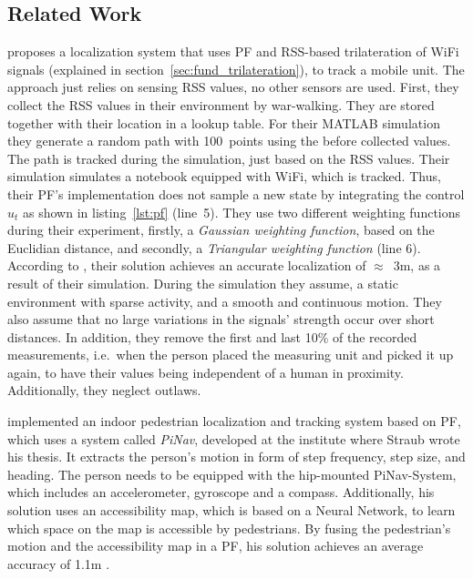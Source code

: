 \subsection{Related Work}

\citet{Siddiqui:tracking} proposes a localization system that uses \ac{PF} and \ac{RSS}-based trilateration of WiFi signals (explained in section~\ref{sec:fund_trilateration}), to track a mobile unit. The approach just relies on sensing \ac{RSS} values, no other sensors are used. First, they collect the \ac{RSS} values in their environment by war-walking. They are stored together with their location in a lookup table. For their MATLAB simulation they generate a random path with 100~points using the before collected values. The path is tracked during the simulation, just based on the \ac{RSS} values. Their simulation simulates a notebook equipped with WiFi, which is tracked. Thus, their \ac{PF}'s implementation does not sample a new state by integrating the control $u_t$ as shown in listing~\ref{lst:pf} (line~5). They use two different weighting functions during their experiment, firstly, a \emph{Gaussian weighting function}, based on the Euclidian distance, and secondly, a \emph{Triangular weighting function} (line 6). According to \citet{Siddiqui:tracking}, their solution achieves an accurate localization of $\approx$~3m, as a result of their simulation. During the simulation they assume, a static environment with sparse activity, and a smooth and continuous motion. They also assume that no large variations in the signals' strength occur over short distances. In addition, they remove the first and last 10\% of the recorded measurements, i.e.\ when the person placed the measuring unit and picked it up again, to have their values being independent of a human in proximity. Additionally, they neglect outlaws.

\citet{straub:pf} implemented an indoor pedestrian localization and tracking system based on \ac{PF}, which uses a system called \emph{PiNav}, developed at the institute where Straub wrote his thesis. It extracts the person's motion in form of step frequency, step size, and heading. The person needs to be equipped with the hip-mounted PiNav-System, which includes an accelerometer, gyroscope and a compass. Additionally, his solution uses an accessibility map, which is based on a Neural Network, to learn which space on the map is accessible by pedestrians. By fusing the pedestrian's motion and the accessibility map in a \ac{PF}, his solution achieves an average accuracy of 1.1m \citep{straub:pf}.

